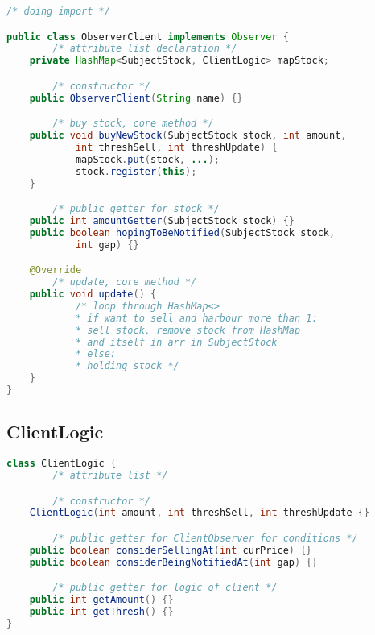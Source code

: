\documentclass[a4paper]{article}
\begin{document}
\begin{lstlisting}[language=java]
/* doing import */

public class ObserverClient implements Observer {
        /* attribute list declaration */
	private HashMap<SubjectStock, ClientLogic> mapStock;

        /* constructor */
	public ObserverClient(String name) {}

        /* buy stock, core method */
	public void buyNewStock(SubjectStock stock, int amount,
            int threshSell, int threshUpdate) {
            mapStock.put(stock, ...);
            stock.register(this);
	}

        /* public getter for stock */
	public int amountGetter(SubjectStock stock) {}
	public boolean hopingToBeNotified(SubjectStock stock,
            int gap) {}

	@Override
        /* update, core method */
	public void update() {
            /* loop through HashMap<>
            * if want to sell and harbour more than 1:
            * sell stock, remove stock from HashMap
            * and itself in arr in SubjectStock
            * else:
            * holding stock */
	}
}
\end{lstlisting}

\subsection{ClientLogic}%
\label{sub:clientlogic}

\begin{lstlisting}[language=java]
class ClientLogic {
        /* attribute list */

        /* constructor */
	ClientLogic(int amount, int threshSell, int threshUpdate {}

        /* public getter for ClientObserver for conditions */
	public boolean considerSellingAt(int curPrice) {}
	public boolean considerBeingNotifiedAt(int gap) {}

        /* public getter for logic of client */
	public int getAmount() {}
	public int getThresh() {}
}
\end{lstlisting}
\end{document}
